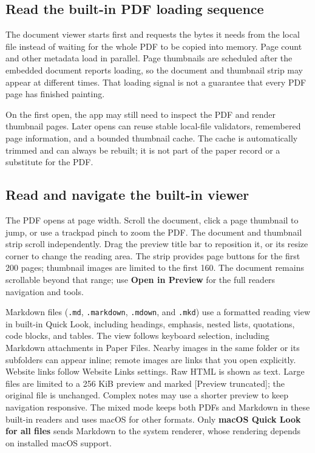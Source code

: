 \documentclass[10pt,letterpaper,oneside]{scrreprt}
\begin{document}
\subsection{Read the built-in PDF loading sequence}\label{read-the-built-in-pdf-loading-sequence}

The document viewer starts first and requests the bytes it needs from the local file instead of waiting for the whole PDF to be copied into memory. Page count and other metadata load in parallel. Page thumbnails are scheduled after the embedded document reports loading, so the document and thumbnail strip may appear at different times. That loading signal is not a guarantee that every PDF page has finished painting.

On the first open, the app may still need to inspect the PDF and render thumbnail pages. Later opens can reuse stable local-file validators, remembered page information, and a bounded thumbnail cache. The cache is automatically trimmed and can always be rebuilt; it is not part of the paper record or a substitute for the PDF.

\subsection{Read and navigate the built-in viewer}\label{read-and-navigate-the-built-in-viewer}

The PDF opens at page width. Scroll the document, click a page thumbnail to jump, or use a trackpad pinch to zoom the PDF. The document and thumbnail strip scroll independently. Drag the preview title bar to reposition it, or its resize corner to change the reading area. The strip provides page buttons for the first 200 pages; thumbnail images are limited to the first 160. The document remains scrollable beyond that range; use \textbf{Open in Preview} for the full reader\textquotesingle s navigation and tools.

Markdown files (\texttt{.md}, \texttt{.markdown}, \texttt{.mdown}, and \texttt{.mkd}) use a formatted reading view in built-in Quick Look, including headings, emphasis, nested lists, quotations, code blocks, and tables. The view follows keyboard selection, including Markdown attachments in Paper Files. Nearby images in the same folder or its subfolders can appear inline; remote images are links that you open explicitly. Website links follow Website Links settings. Raw HTML is shown as text. Large files are limited to a 256 KiB preview and marked {[}Preview truncated{]}; the original file is unchanged. Complex notes may use a shorter preview to keep navigation responsive. The mixed mode keeps both PDFs and Markdown in these built-in readers and uses macOS for other formats. Only \textbf{macOS Quick Look for all files} sends Markdown to the system renderer, whose rendering depends on installed macOS support.
\end{document}
